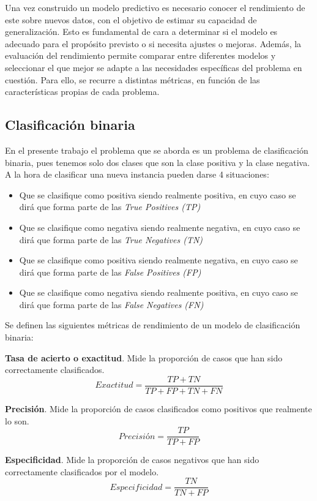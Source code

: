 \documentclass[12pt,a4paper,]{book}
\numberwithin{dummy}{section}
\theoremstyle{ocrenumbox}
\theoremstyle{blacknumex}
\theoremstyle{blacknumbox}
\theoremstyle{ocrenum}
\theoremstyle{ocrenum}
\begin{document}
Una vez construido un modelo predictivo es necesario conocer el
rendimiento de este sobre nuevos datos, con el objetivo de estimar su
capacidad de generalización. Esto es fundamental de cara a determinar si
el modelo es adecuado para el propósito previsto o si necesita ajustes o
mejoras. Además, la evaluación del rendimiento permite comparar entre
diferentes modelos y seleccionar el que mejor se adapte a las
necesidades específicas del problema en cuestión. Para ello, se recurre
a distintas métricas, en función de las características propias de cada
problema.

\hypertarget{clasificaciuxf3n-binaria}{%
\subsection{Clasificación binaria}\label{clasificaciuxf3n-binaria}}

En el presente trabajo el problema que se aborda es un problema de
clasificación binaria, pues tenemos solo dos clases que son la clase
positiva y la clase negativa. A la hora de clasificar una nueva
instancia pueden darse 4 situaciones:

\begin{itemize}
\item
  Que se clasifique como positiva siendo realmente positiva, en cuyo
  caso se dirá que forma parte de las \emph{True Positives (TP)}
\item
  Que se clasifique como negativa siendo realmente negativa, en cuyo
  caso se dirá que forma parte de las \emph{True Negatives (TN)}
\item
  Que se clasifique como positiva siendo realmente negativa, en cuyo
  caso se dirá que forma parte de las \emph{False Positives (FP)}
\item
  Que se clasifique como negativa siendo realmente positiva, en cuyo
  caso se dirá que forma parte de las \emph{False Negatives (FN)}
\end{itemize}

Se definen las siguientes métricas de rendimiento de un modelo de
clasificación binaria:

\textbf{Tasa de acierto o exactitud}. Mide la proporción de casos que
han sido correctamente clasificados.
\[Exactitud = \frac{TP + TN}{TP + FP + TN + FN}\]

\textbf{Precisión}. Mide la proporción de casos clasificados como
positivos que realmente lo son. \[ Precisión = \frac{TP}{TP + FP}\]

\textbf{Especificidad}. Mide la proporción de casos negativos que han
sido correctamente clasificados por el modelo.
\[ Especificidad = \frac{TN}{TN + FP}\]
\end{document}
